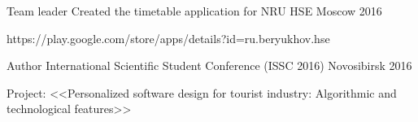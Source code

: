 \begin{cventries}
\cventry
{Team leader} %
{Created the timetable application for NRU HSE} %
{Moscow} %
{2016} %
{ %
	\begin{cvitems}
		\item {https://play.google.com/store/apps/details?id=ru.beryukhov.hse}
	\end{cvitems}
}
\noindent









\cventry
{Author} %
{International Scientific Student Conference (ISSC 2016)} %
{Novosibirsk} %
{2016} %
{ %
\begin{cvitems}
\item {Project: <<Personalized software design for tourist industry: Algorithmic and technological features>>}
\end{cvitems}
}
\noindent


\end{cventries}
